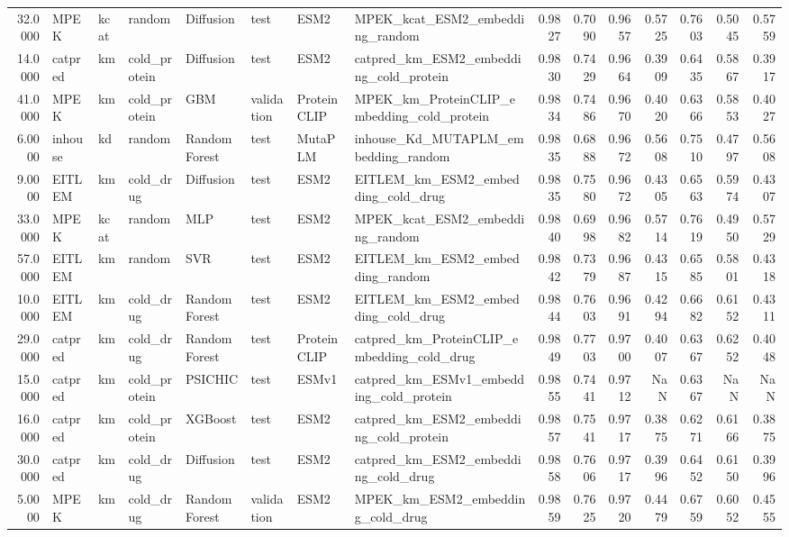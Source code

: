 \begin{tabular}{rlllllllrrrrrrr}
32.0000 & MPEK & kcat & random & Diffusion & test & ESM2 & MPEK_kcat_ESM2_embedding_random & 0.9827 & 0.7090 & 0.9657 & 0.5725 & 0.7603 & 0.5045 & 0.5759 \\
14.0000 & catpred & km & cold_protein & Diffusion & test & ESM2 & catpred_km_ESM2_embedding_cold_protein & 0.9830 & 0.7429 & 0.9664 & 0.3909 & 0.6435 & 0.5867 & 0.3917 \\
41.0000 & MPEK & km & cold_protein & GBM & validation & ProteinCLIP & MPEK_km_ProteinCLIP_embedding_cold_protein & 0.9834 & 0.7486 & 0.9670 & 0.4020 & 0.6366 & 0.5853 & 0.4027 \\
6.0000 & inhouse & kd & random & Random Forest & test & MutaPLM & inhouse_Kd_MUTAPLM_embedding_random & 0.9835 & 0.6888 & 0.9672 & 0.5608 & 0.7510 & 0.4797 & 0.5608 \\
9.0000 & EITLEM & km & cold_drug & Diffusion & test & ESM2 & EITLEM_km_ESM2_embedding_cold_drug & 0.9835 & 0.7580 & 0.9672 & 0.4305 & 0.6563 & 0.5974 & 0.4307 \\
33.0000 & MPEK & kcat & random & MLP & test & ESM2 & MPEK_kcat_ESM2_embedding_random & 0.9840 & 0.6998 & 0.9682 & 0.5714 & 0.7619 & 0.4950 & 0.5729 \\
57.0000 & EITLEM & km & random & SVR & test & ESM2 & EITLEM_km_ESM2_embedding_random & 0.9842 & 0.7379 & 0.9687 & 0.4315 & 0.6585 & 0.5801 & 0.4318 \\
10.0000 & EITLEM & km & cold_drug & Random Forest & test & ESM2 & EITLEM_km_ESM2_embedding_cold_drug & 0.9844 & 0.7603 & 0.9691 & 0.4294 & 0.6682 & 0.6152 & 0.4311 \\
29.0000 & catpred & km & cold_drug & Random Forest & test & ProteinCLIP & catpred_km_ProteinCLIP_embedding_cold_drug & 0.9849 & 0.7703 & 0.9700 & 0.4007 & 0.6367 & 0.6252 & 0.4048 \\
15.0000 & catpred & km & cold_protein & PSICHIC & test & ESMv1 & catpred_km_ESMv1_embedding_cold_protein & 0.9855 & 0.7441 & 0.9712 & NaN & 0.6367 & NaN & NaN \\
16.0000 & catpred & km & cold_protein & XGBoost & test & ESM2 & catpred_km_ESM2_embedding_cold_protein & 0.9857 & 0.7541 & 0.9717 & 0.3875 & 0.6271 & 0.6166 & 0.3875 \\
30.0000 & catpred & km & cold_drug & Diffusion & test & ESM2 & catpred_km_ESM2_embedding_cold_drug & 0.9858 & 0.7606 & 0.9717 & 0.3996 & 0.6452 & 0.6150 & 0.3996 \\
5.0000 & MPEK & km & cold_drug & Random Forest & validation & ESM2 & MPEK_km_ESM2_embedding_cold_drug & 0.9859 & 0.7625 & 0.9720 & 0.4479 & 0.6759 & 0.6052 & 0.4555 \\

\end{tabular}
